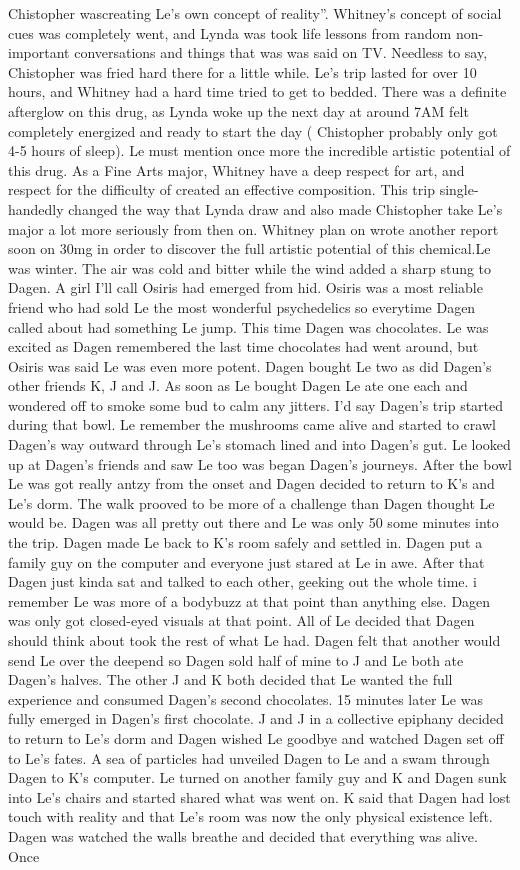 \documentclass[12pt]{book}
\begin{document}
Chistopher wascreating Le's own concept of reality''. Whitney's concept of social cues was completely went, and Lynda was took life lessons from random non-important conversations and things that was was said on TV. Needless to say, Chistopher was fried hard there for a little while. Le's trip lasted for over 10 hours, and Whitney had a hard time tried to get to bedded. There was a definite afterglow on this drug, as Lynda woke up the next day at around 7AM felt completely energized and ready to start the day ( Chistopher probably only got 4-5 hours of sleep). Le must mention once more the incredible artistic potential of this drug. As a Fine Arts major, Whitney have a deep respect for art, and respect for the difficulty of created an effective composition. This trip single-handedly changed the way that Lynda draw and also made Chistopher take Le's major a lot more seriously from then on. Whitney plan on wrote another report soon on 30mg in order to discover the full artistic potential of this chemical.Le was winter. The air was cold and bitter while the wind added a sharp stung to Dagen. A girl I'll call Osiris had emerged from hid. Osiris was a most reliable friend who had sold Le the most wonderful psychedelics so everytime Dagen called about had something Le jump. This time Dagen was chocolates. Le was excited as Dagen remembered the last time chocolates had went around, but Osiris was said Le was even more potent. Dagen bought Le two as did Dagen's other friends K, J and J. As soon as Le bought Dagen Le ate one each and wondered off to smoke some bud to calm any jitters. I'd say Dagen's trip started during that bowl. Le remember the mushrooms came alive and started to crawl Dagen's way outward through Le's stomach lined and into Dagen's gut. Le looked up at Dagen's friends and saw Le too was began Dagen's journeys. After the bowl Le was got really antzy from the onset and Dagen decided to return to K's and Le's dorm. The walk prooved to be more of a challenge than Dagen thought Le would be. Dagen was all pretty out there and Le was only 50 some minutes into the trip. Dagen made Le back to K's room safely and settled in. Dagen put a family guy on the computer and everyone just stared at Le in awe. After that Dagen just kinda sat and talked to each other, geeking out the whole time. i remember Le was more of a bodybuzz at that point than anything else. Dagen was only got closed-eyed visuals at that point. All of Le decided that Dagen should think about took the rest of what Le had. Dagen felt that another would send Le over the deepend so Dagen sold half of mine to J and Le both ate Dagen's halves. The other J and K both decided that Le wanted the full experience and consumed Dagen's second chocolates. 15 minutes later Le was fully emerged in Dagen's first chocolate. J and J in a collective epiphany decided to return to Le's dorm and Dagen wished Le goodbye and watched Dagen set off to Le's fates. A sea of particles had unveiled Dagen to Le and a swam through Dagen to K's computer. Le turned on another family guy and K and Dagen sunk into Le's chairs and started shared what was went on. K said that Dagen had lost touch with reality and that Le's room was now the only physical existence left. Dagen was watched the walls breathe and decided that everything was alive. Once 
\end{document}
